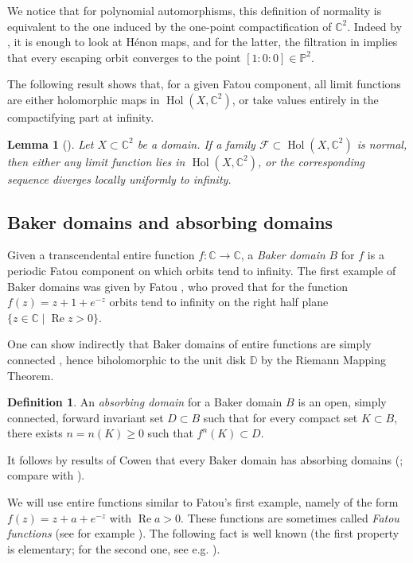 \documentclass[a4paper, 12pt, twoside]{amsart}
\newtheorem{lem}[thm]{Lemma}
\theoremstyle{definition}
\newtheorem{defn}[thm]{Definition}
\numberwithin{equation}{section}
\newcommand{\re}{\operatorname{Re}}
\newcommand{\Hol}{\operatorname{Hol}}
\newcommand{\C}{{\mathbb C}}
\newcommand{\D}{{\mathbb D}}
\renewcommand{\P}{{\mathbb P}}
\newcommand{\ra}{\rightarrow}
\begin{document}
  We notice that for polynomial automorphisms, this definition of normality  is equivalent to the one induced by the one-point compactification of $\C^2$.  Indeed by \cite{FM89}, it is enough to look at H\'enon maps, and for the latter, the filtration in  \cite{BS91} implies that every escaping orbit converges to the point $[1:0:0] \in \P^2$.
  
  The following result shows that, for a given Fatou component, all limit functions are either holomorphic maps in $\Hol(X, \C^2)$, or take values entirely in the compactifying part at infinity.

\begin{lem}[{\cite[Lemma 2.4]{ABFP2019}}]\label{Lemma:NormalityRelationsBakerVariant}
	Let $X\subset \C^2$ be a domain. If a family $\mathcal{F} \subset \Hol(X, \C^2)$ is normal, then either any limit function lies in $\Hol(X, \C^2)$, or the corresponding sequence diverges locally uniformly to infinity.
\end{lem}  
  
  \subsection{Baker domains and absorbing domains}\label{sec:Baker}
 Given a transcendental entire function $f:\C\ra\C$, a \emph{Baker domain} $B$ for $f$ is a periodic Fatou component on which orbits tend to infinity. The first example of Baker domains was given by Fatou \cite[Example I]{fatou19}, who proved that for the function $f(z)=z+1+e^{-z}$ orbits tend to infinity on the right half plane $\{z\in\C\mid\re z>0\}$.
 
One can show indirectly that Baker domains of entire functions are simply connected  \cite{BakerMCD}, hence biholomorphic to the unit disk $\D$ by the Riemann Mapping Theorem. 
 
 \begin{defn} An \emph{absorbing domain} for a Baker domain $B$ is an open, simply connected, forward invariant  set $D\subset B$ such that for every compact set $K\subset B$, there exists $n=n(K)\ge 0$ such that $f^{n}(K)\subset D$. 
 \end{defn}
 
It follows by results of Cowen that every Baker domain has absorbing domains (\cite{Cowen}; compare with  \cite{BFJK}). 

 
We will use entire functions similar to Fatou's first example, namely of the form $f(z)=z+a+e^{-z}$ with $\re a>0$. These functions are sometimes called \emph{Fatou functions} (see for example \cite{Vasso}). The following fact is well known (the first property is elementary; for the second one, see e.g.  \cite[proof of Theorem 2.5]{KotusUrbanski05}). 
\end{document}
